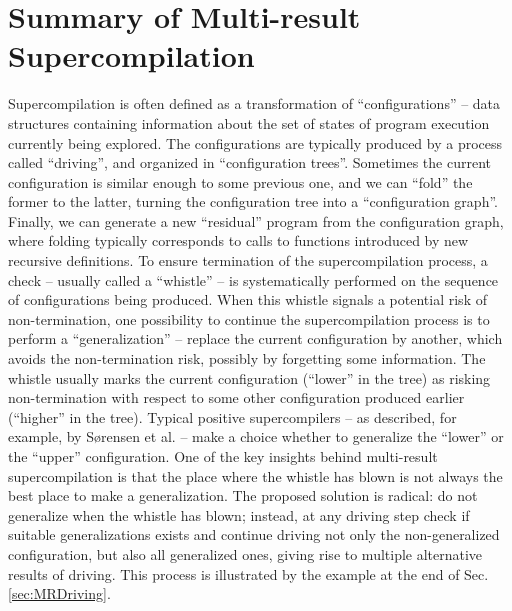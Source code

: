 \documentclass[submission,copyright,creativecommons]{eptcs}
\begin{document}
\section{Summary of Multi-result Supercompilation}\label{sec:MRSCSummary}

Supercompilation is often defined as a transformation of ``configurations'' --
data structures containing information about the set of states of program execution
currently being explored.
The configurations are typically produced by a process called ``driving'',
and organized in ``configuration trees''.
Sometimes the current configuration is similar enough to some previous one,
and we can ``fold'' the former to the latter,
turning the configuration tree into a ``configuration graph''.
Finally, we can generate a new ``residual'' program from the configuration
graph, where folding typically corresponds to calls to functions introduced by new
recursive definitions.
To ensure termination of the supercompilation process, a check -- usually called 
a ``whistle'' -- is systematically performed on the sequence of configurations
being produced.
When this whistle signals a potential risk of non-termination, one possibility
to continue the supercompilation process is to perform a ``generalization'' --
replace the current configuration by another, which avoids the non-termination
risk, possibly by forgetting some information.
The whistle usually marks the current configuration (``lower'' in the tree) as risking
non-termination with respect to some other configuration produced earlier (``higher'' in the tree).
Typical positive supercompilers -- as described, for example, by S{\o}rensen et al. \cite{sorm98b} --
make a choice whether to generalize the ``lower'' or the ``upper'' configuration.
One of the key insights behind multi-result supercompilation is that the place
where the whistle has blown is not always the best place to make a generalization.
The proposed solution is radical: do not generalize when the whistle has blown;
instead, at any driving step check if suitable generalizations exists and
continue driving not only the non-generalized configuration, but also
all generalized ones,
giving rise to multiple alternative results of driving.
This process is illustrated by the example at the end of Sec. \ref{sec:MRDriving}.
\end{document}
